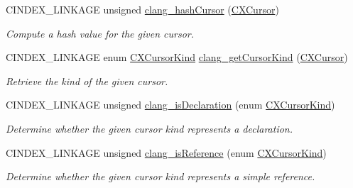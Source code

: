 \begin{DoxyCompactItemize}
\mbox{\label{group__CINDEX__CURSOR__MANIP_gabf27e0eaee38ae9e7453f55754d4929b}} 
C\+I\+N\+D\+E\+X\+\_\+\+L\+I\+N\+K\+A\+GE unsigned \hyperlink{group__CINDEX__CURSOR__MANIP_gabf27e0eaee38ae9e7453f55754d4929b}{clang\+\_\+hash\+Cursor} (\hyperlink{structCXCursor}{C\+X\+Cursor})
\begin{DoxyCompactList}\small\item\em Compute a hash value for the given cursor. \end{DoxyCompactList}\item 
\mbox{\label{group__CINDEX__CURSOR__MANIP_ga018aaf60362cb751e517d9f8620d490c}} 
C\+I\+N\+D\+E\+X\+\_\+\+L\+I\+N\+K\+A\+GE enum \hyperlink{group__CINDEX_gaaccc432245b4cd9f2d470913f9ef0013}{C\+X\+Cursor\+Kind} \hyperlink{group__CINDEX__CURSOR__MANIP_ga018aaf60362cb751e517d9f8620d490c}{clang\+\_\+get\+Cursor\+Kind} (\hyperlink{structCXCursor}{C\+X\+Cursor})
\begin{DoxyCompactList}\small\item\em Retrieve the kind of the given cursor. \end{DoxyCompactList}\item 
\mbox{\label{group__CINDEX__CURSOR__MANIP_ga660aa4846fce0a54e20073ab6a5465a0}} 
C\+I\+N\+D\+E\+X\+\_\+\+L\+I\+N\+K\+A\+GE unsigned \hyperlink{group__CINDEX__CURSOR__MANIP_ga660aa4846fce0a54e20073ab6a5465a0}{clang\+\_\+is\+Declaration} (enum \hyperlink{group__CINDEX_gaaccc432245b4cd9f2d470913f9ef0013}{C\+X\+Cursor\+Kind})
\begin{DoxyCompactList}\small\item\em Determine whether the given cursor kind represents a declaration. \end{DoxyCompactList}\item 
C\+I\+N\+D\+E\+X\+\_\+\+L\+I\+N\+K\+A\+GE unsigned \hyperlink{group__CINDEX__CURSOR__MANIP_gaf1bf500b9ada62671b53831d023387ba}{clang\+\_\+is\+Reference} (enum \hyperlink{group__CINDEX_gaaccc432245b4cd9f2d470913f9ef0013}{C\+X\+Cursor\+Kind})
\begin{DoxyCompactList}\small\item\em Determine whether the given cursor kind represents a simple reference. \end{DoxyCompactList}\item 
\mbox{\label{group__CINDEX__CURSOR__MANIP_ga8e537f2f251a92a799d6cc8459614d42}} 

\end{DoxyCompactItemize}
